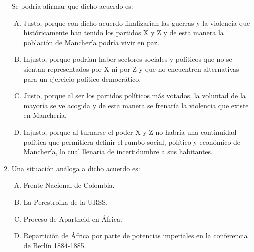 \begin{enumerate}
Se podría afirmar que dicho acuerdo es:

\begin{enumerate}[(A)]
\item Justo, porque con dicho acuerdo finalizarían las guerras y la violencia que históricamente han tenido los partidos X y Z y de esta manera la población de Manchería podría vivir en paz.
\item Injusto, porque podrían haber sectores sociales y políticos que no se sientan representados por X ni por Z y que no encuentren alternativas para un ejercicio político democrático.
\item Justo, porque al ser los partidos políticos más votados, la voluntad de la mayoría se ve acogida y de esta manera se frenaría la violencia que existe en Manchería. 
\item Injusto, porque al turnarse el poder X y Z no habría una continuidad política que permitiera definir el rumbo social, político y económico de Manchería, lo cual llenaría de incertidumbre a sus habitantes.

\end{enumerate}

\item Una situación análoga a dicho acuerdo es:\label{socandres-25}

\begin{enumerate}[(A)]
\item Frente Nacional de Colombia.
\item La Perestroika de la URSS.
\item Proceso de Apartheid en África.
\item Repartición de África por parte de potencias imperiales en la conferencia de Berlín 1884-1885.
\end{enumerate}


\end{enumerate}


